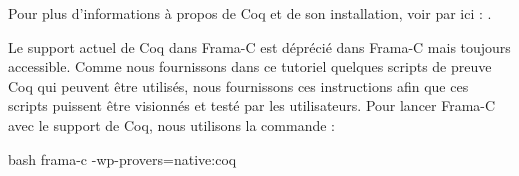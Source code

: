 Pour plus d'informations à propos de Coq et de son installation, voir par 
ici : .


Le support actuel de Coq dans Frama-C est déprécié dans Frama-C mais toujours
accessible. Comme nous fournissons dans ce tutoriel quelques scripts de preuve
Coq qui peuvent être utilisés, nous fournissons ces instructions afin que
ces scripts puissent être visionnés et testé par les utilisateurs. Pour lancer
Frama-C avec le support de Coq, nous utilisons la commande :


\begin{CodeBlock}{bash}
  frama-c -wp-provers=native:coq
\end{CodeBlock}
